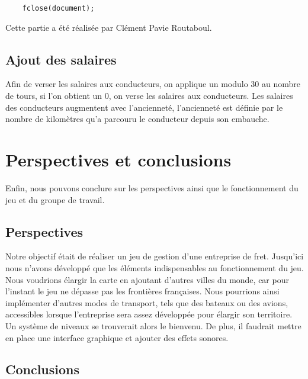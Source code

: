 \documentclass[a4paper, 12pt]{article}
\begin{document}
\begin{lstlisting}
    fclose(document);
\end{lstlisting}
        Cette partie a été réalisée par Clément Pavie Routaboul.
    \subsection{Ajout des salaires}
        Afin de verser les salaires aux conducteurs, on applique un modulo 30 au nombre de tours, si l'on obtient un 0, on verse les salaires aux conducteurs. Les salaires des conducteurs augmentent avec l'ancienneté, l'ancienneté est définie par le nombre de kilomètres qu'a parcouru le conducteur depuis son embauche.
\newpage
\section{Perspectives et conclusions}
    Enfin, nous pouvons conclure sur les perspectives ainsi que le fonctionnement du jeu et du groupe de travail.
      \subsection{Perspectives}
      Notre objectif était de réaliser un jeu de gestion d'une entreprise de fret. Jusqu’ici nous n’avons développé que les éléments indispensables au fonctionnement du jeu. Nous voudrions élargir la carte en ajoutant d'autres villes du monde, car pour l’instant le jeu ne dépasse pas les frontières françaises. Nous pourrions ainsi implémenter d’autres modes de transport, tels que des bateaux ou des avions, accessibles lorsque l’entreprise sera assez développée pour élargir son territoire. Un système de niveaux se trouverait alors le bienvenu. De plus, il faudrait mettre en place une interface graphique et ajouter des effets sonores.

      \subsection{Conclusions}
\end{document}

